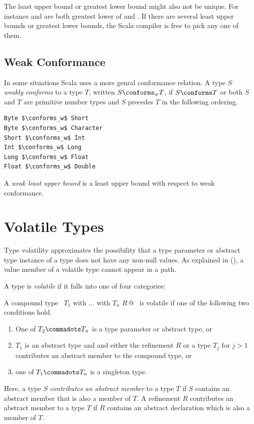 The least upper bound or greatest lower bound might also not be
unique. For instance  and  are both
greatest lower of  and . If there are several
least upper bounds or greatest lower bounds, the Scala compiler is
free to pick any one of them.

\subsection{Weak Conformance}\label{sec:weakconformance}

In some situations Scala uses a more genral conformance relation. A 
type $S$ {\em weakly conforms} 
to a type $T$, written $S \conforms_w
T$, if $S \conforms T$ or both $S$ and $T$ are primitive number types
and $S$ precedes $T$ in the following ordering.
\begin{lstlisting}
Byte $\conforms_w$ Short 
Byte $\conforms_w$ Character
Short $\conforms_w$ Int
Int $\conforms_w$ Long
Long $\conforms_w$ Float
Float $\conforms_w$ Double
\end{lstlisting}

A {\em weak least upper bound} is a least upper bound with respect to
weak conformance.

\section{Volatile Types}
\label{sec:volatile-types}

Type volatility approximates the possibility that a type parameter or abstract type instance
of a type does not have any non-null values.  As explained in
(), a value member of a volatile type cannot appear in
a path.
  
A type is {\em volatile} if it falls into one of four categories:

A compound type ~\lstinline@$T_1$ with $\ldots$ with $T_n$ {$R\,$}@~
is volatile if one of the following two conditions hold.
\begin{enumerate}
\item One of $T_2 \commadots T_n$ is a type parameter or abstract type, or
\item $T_1$ is an abstract type and and either the refinement $R$ 
  or a type $T_j$ for $j > 1$ contributes an abstract member
  to the compound type, or
\item one of $T_1 \commadots T_n$ is a singleton type.
\end{enumerate}
Here, a type $S$ {\em contributes an abstract member} to a type $T$ if
$S$ contains an abstract member that is also a member of $T$.
A refinement $R$ contributes an abstract member to a type $T$ if $R$
contains an abstract declaration which is also a member of $T$.

